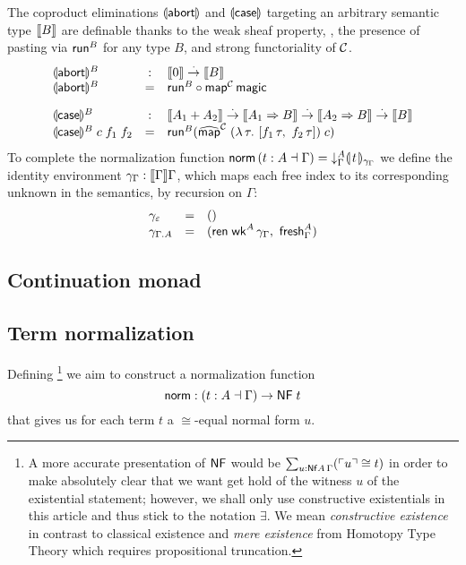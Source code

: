\documentclass[a4paper,USenglish,cleveref, autoref]{lipics-v2019}
\begin{document}
The coproduct eliminations $\denabort$ and $\dencase$
targeting an arbitrary semantic type $\den B$ are definable thanks to
the weak sheaf property, \ie, the presence of pasting via $\trun^B$
for any type $B$, and strong functoriality of $\C$.
\[
\begin{array}{lcl}
  \denabort^B & : & \den \tyzero \todot \den B \\
  \denabort^B & = & \trun^B \comp \tmap[\C]\,\tmagic
\\[2ex]
  \dencase^B  & : & \den{A_1 + A_2}
    \todot \den{A_1 \To B}
    \todot \den{A_2 \To B}
    \todot \den{B} \\
  \dencase^B\;c\;f_1\;f_2 & = &
    \trun^B (\stmap[\C]\;(\lambda\,\tau.\ [f_1\,\tau,\ f_2\,\tau])\;c) \\
\end{array}
\]
To complete the normalization function
$\tnorm\,(t : A \from \Gamma) = \downG A \dent t {\idenv \Gamma}$
we define the identity environment $\idenv \Gamma : \den \Gamma \Gamma$,
which maps each free index to its corresponding unknown in the
semantics, by recursion on $\Gamma$:
\[
\begin{array}{lcl}
  \idenv \cempty & = & \ttempty \\
  \idenv {\cext \Gamma A} & = & (\tren\;\twk^A\,\idenv\Gamma, \  \tfresh^A_\Gamma)\\
\end{array}
\]

\subsection{Continuation monad}



\clearpage

\subsection{Term normalization}

Defining%
\footnote{%
A more accurate presentation of $\tNF$ would be
$\sum_{u : \tNf A\,\Gamma} (\tm u \cong t)$
in order to make absolutely clear that we
want get hold of the witness $u$ of the existential statement;
however, we shall only use constructive
existentials
in this article and thus stick to the notation $\exists$.
We mean \emph{constructive existence} in
  contrast to classical existence and
  \emph{mere existence} from Homotopy Type Theory which
  requires propositional truncation.
}
we aim to construct a normalization function
\[
  \tnorm : (t : A \from \Gamma) \to \NF t
\]
that gives us for each term $t$ a $\cong$-equal normal form $u$.
\end{document}
